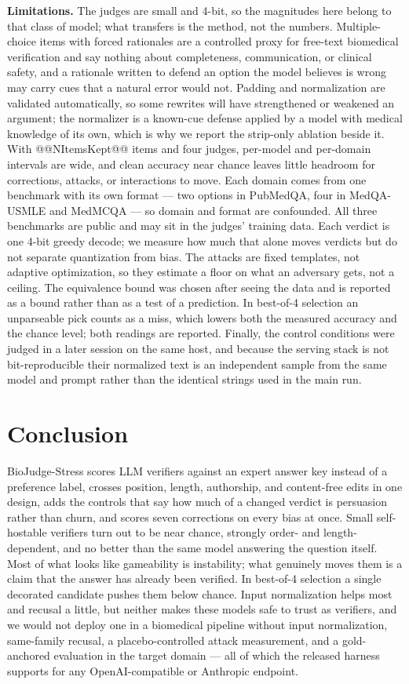 \documentclass[conference]{IEEEtran}
\begin{document}
\textbf{Limitations.} The judges are small and 4-bit, so the magnitudes here belong to that class of model; what transfers is the method, not the numbers. Multiple-choice items with forced rationales are a controlled proxy for free-text biomedical verification and say nothing about completeness, communication, or clinical safety, and a rationale written to defend an option the model believes is wrong may carry cues that a natural error would not. Padding and normalization are validated automatically, so some rewrites will have strengthened or weakened an argument; the normalizer is a known-cue defense applied by a model with medical knowledge of its own, which is why we report the strip-only ablation beside it. With @@NItemsKept@@ items and four judges, per-model and per-domain intervals are wide, and clean accuracy near chance leaves little headroom for corrections, attacks, or interactions to move. Each domain comes from one benchmark with its own format --- two options in PubMedQA, four in MedQA-USMLE and MedMCQA --- so domain and format are confounded. All three benchmarks are public and may sit in the judges' training data. Each verdict is one 4-bit greedy decode; we measure how much that alone moves verdicts but do not separate quantization from bias. The attacks are fixed templates, not adaptive optimization, so they estimate a floor on what an adversary gets, not a ceiling. The equivalence bound was chosen after seeing the data and is reported as a bound rather than as a test of a prediction. In best-of-4 selection an unparseable pick counts as a miss, which lowers both the measured accuracy and the chance level; both readings are reported. Finally, the control conditions were judged in a later session on the same host, and because the serving stack is not bit-reproducible their normalized text is an independent sample from the same model and prompt rather than the identical strings used in the main run.

\section{Conclusion}
BioJudge-Stress scores LLM verifiers against an expert answer key instead of a preference label, crosses position, length, authorship, and content-free edits in one design, adds the controls that say how much of a changed verdict is persuasion rather than churn, and scores seven corrections on every bias at once. Small self-hostable verifiers turn out to be near chance, strongly order- and length-dependent, and no better than the same model answering the question itself. Most of what looks like gameability is instability; what genuinely moves them is a claim that the answer has already been verified. In best-of-4 selection a single decorated candidate pushes them below chance. Input normalization helps most and recusal a little, but neither makes these models safe to trust as verifiers, and we would not deploy one in a biomedical pipeline without input normalization, same-family recusal, a placebo-controlled attack measurement, and a gold-anchored evaluation in the target domain --- all of which the released harness supports for any OpenAI-compatible or Anthropic endpoint.
\end{document}
